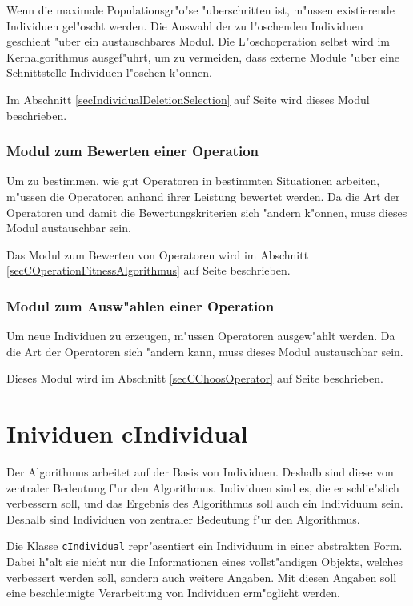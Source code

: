 Wenn die maximale Populationsgr"o"se "uberschritten ist, m"ussen existierende Individuen gel"oscht werden. Die Auswahl der zu l"oschenden Individuen geschieht "uber ein austauschbares Modul. Die L"oschoperation selbst wird im Kernalgorithmus ausgef"uhrt, um zu vermeiden, dass externe Module "uber eine Schnittstelle Individuen l"oschen k"onnen.

Im Abschnitt \ref{secIndividualDeletionSelection} auf Seite \pageref{secIndividualDeletionSelection} wird dieses Modul beschrieben.


\subsubsection{Modul zum Bewerten einer Operation}

Um zu bestimmen, wie gut Operatoren in bestimmten Situationen arbeiten, m"ussen die Operatoren anhand ihrer Leistung bewertet werden. Da die Art der Operatoren und damit die Bewertungskriterien sich "andern k"onnen, muss dieses Modul austauschbar sein.

Das Modul zum Bewerten von Operatoren wird im Abschnitt \ref{secCOperationFitnessAlgorithmus} auf Seite \pageref{secCOperationFitnessAlgorithmus} beschrieben.


\subsubsection{Modul zum Ausw"ahlen einer Operation}

Um neue Individuen zu erzeugen, m"ussen Operatoren ausgew"ahlt werden. Da die Art der Operatoren sich "andern kann, muss dieses Modul austauschbar sein.

Dieses Modul wird im Abschnitt \ref{secCChoosOperator} auf Seite \pageref{secCChoosOperator} beschrieben.


\section{Inividuen cIndividual}\label{cIndividual}
\label{secIndividual}

Der Algorithmus arbeitet auf der Basis von Individuen. Deshalb sind diese von zentraler Bedeutung f"ur den Algorithmus. Individuen sind es, die er schlie"slich verbessern soll, und das Ergebnis des Algorithmus soll auch ein Individuum sein. Deshalb sind Individuen von zentraler Bedeutung f"ur den Algorithmus.

Die Klasse \verb|cIndividual| repr"asentiert ein Individuum in einer abstrakten Form. Dabei h"alt sie nicht nur die Informationen eines vollst"andigen Objekts, welches verbessert werden soll, sondern auch weitere Angaben. Mit diesen Angaben soll eine beschleunigte Verarbeitung von Individuen erm"oglicht werden.

